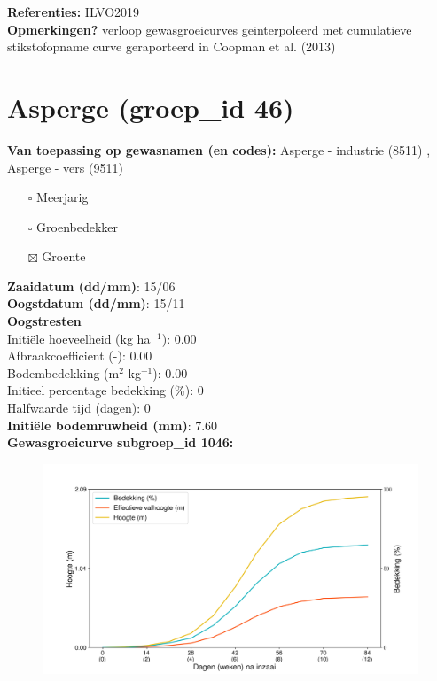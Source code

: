 \documentclass{article}
\begin{document}
  \textbf{Referenties:} ILVO2019 \vspace{0.10cm} \\ 
  \textbf{Opmerkingen?} verloop gewasgroeicurves geinterpoleerd met cumulatieve stikstofopname curve geraporteerd in Coopman et al. (2013) \vspace{0.10cm} \\ 
 \newpage 
 \section{Asperge (groep\_id 46)} 
 \textbf{Van toepassing op gewasnamen (en codes):} Asperge - industrie (8511) , Asperge - vers (9511) 
 \begin{multicols}{3} \begin{itemize} \item[$\square$] Meerjarig \item[$\square$] Groenbedekker \item[$\boxtimes$] Groente \end{itemize} \end{multicols} 
  \textbf{Zaaidatum (dd/mm)}: 15/06  \vspace{0.10cm} \\ 
  \textbf{Oogstdatum (dd/mm)}: 15/11  \vspace{0.10cm} \\ 
  \textbf{Oogstresten} \vspace{0.05cm} \\ 
  \tab Initi\"{e}le hoeveelheid (kg ha$^{-1}$): 0.00 \vspace{0.05cm} \\ 
  \tab Afbraakcoefficient (-): 0.00 \vspace{0.05cm} \\ 
  \tab Bodembedekking (m$^2$ kg$^{-1}$): 0.00 \vspace{0.05cm} \\ 
  \tab Initieel percentage bedekking (\%): 0 \vspace{0.05cm} \\ 
  \tab Halfwaarde tijd (dagen): 0 \vspace{0.05cm} \\ 
  \textbf{Initi\"{e}le bodemruwheid (mm)}: 7.60 \vspace{0.05cm} \\ 
  \textbf{Gewasgroeicurve subgroep\_id 1046:} 
 \begin{center} \begin{figure}[H] \includegraphics[width=12.5cm]{temp/1046.png} \end{figure} \end{center} 
\end{document}
